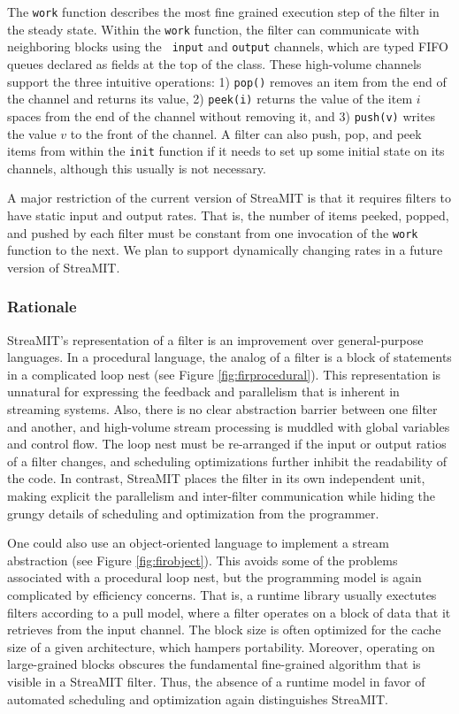 The {\tt work} function describes the most fine grained execution step
of the filter in the steady state.  Within the {\tt work} function,
the filter can communicate with neighboring blocks using the {\tt
input} and {\tt output} channels, which are typed FIFO queues declared
as fields at the top of the class.  These high-volume channels support
the three intuitive operations: 1) {\tt pop()} removes an item from
the end of the channel and returns its value, 2) {\tt peek(i)} returns
the value of the item $i$ spaces from the end of the channel without
removing it, and 3) {\tt push(v)} writes the value $v$ to the front of
the channel.  A filter can also push, pop, and peek items from within
the {\tt init} function if it needs to set up some initial state on
its channels, although this usually is not necessary.

A major restriction of the current version of StreaMIT is that it
requires filters to have static input and output rates.  That is, the
number of items peeked, popped, and pushed by each filter must be
constant from one invocation of the {\tt work} function to the next.
We plan to support dynamically changing rates in a future version of
StreaMIT.

\subsubsection{Rationale}

StreaMIT's representation of a filter is an improvement over
general-purpose languages.  In a procedural language, the analog of a
filter is a block of statements in a complicated loop nest (see Figure
\ref{fig:firprocedural}).  This representation is unnatural for expressing
the feedback and parallelism that is inherent in streaming systems.
Also, there is no clear abstraction barrier between one filter and
another, and high-volume stream processing is muddled with global
variables and control flow.  The loop nest must be re-arranged if the
input or output ratios of a filter changes, and scheduling
optimizations further inhibit the readability of the code.  In
contrast, StreaMIT places the filter in its own independent unit,
making explicit the parallelism and inter-filter communication while
hiding the grungy details of scheduling and optimization from the
programmer.

One could also use an object-oriented language to implement a stream
abstraction (see Figure \ref{fig:firobject}).  This avoids some of the
problems associated with a procedural loop nest, but the programming
model is again complicated by efficiency concerns.  That is, a runtime
library usually exectutes filters according to a pull model, where a
filter operates on a block of data that it retrieves from the input
channel.  The block size is often optimized for the cache size of a
given architecture, which hampers portability.  Moreover, operating on
large-grained blocks obscures the fundamental fine-grained algorithm
that is visible in a StreaMIT filter.  Thus, the absence of a runtime
model in favor of automated scheduling and optimization again
distinguishes StreaMIT.

